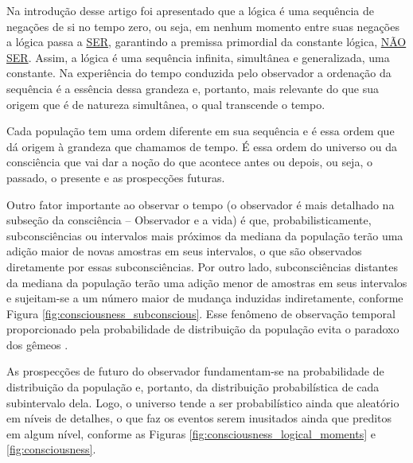 Na introdução desse artigo foi apresentado que a lógica é uma sequência de negações de si no tempo zero, ou seja, em nenhum momento entre suas negações a lógica passa a \underline{SER}, garantindo a premissa primordial da constante lógica, \underline{NÃO SER}. Assim, a lógica é uma sequência infinita, simultânea e generalizada, uma constante. Na experiência do tempo conduzida pelo observador a ordenação da sequência é a essência dessa grandeza e, portanto, mais relevante do que sua origem que é de natureza simultânea, o qual transcende o tempo.

Cada população tem uma ordem diferente em sua sequência e é essa ordem que dá origem à grandeza que chamamos de tempo. É essa ordem do universo ou da consciência que vai dar a noção do que acontece antes ou depois, ou seja, o passado, o presente e as prospecções futuras.

Outro fator importante ao observar o tempo (o observador é mais detalhado na subseção da consciência – Observador e a vida) é que, probabilisticamente, subconsciências ou intervalos mais próximos da mediana da população terão uma adição maior de novas amostras em seus intervalos, o que são observados diretamente por essas subconsciências. Por outro lado, subconsciências distantes da mediana da população terão uma adição menor de amostras em seus intervalos e sujeitam-se a um número maior de mudança induzidas indiretamente, conforme Figura \ref{fig:consciousness_subconscious}. Esse fenômeno de observação temporal proporcionado pela probabilidade de distribuição da população evita o paradoxo dos gêmeos \cite{brasilescola_paradoxo_gemeos}.

As prospecções de futuro do observador fundamentam-se na probabilidade de distribuição da população e, portanto, da distribuição probabilística de cada subintervalo dela. Logo, o universo tende a ser probabilístico ainda que aleatório em níveis de detalhes, o que faz os eventos serem inusitados ainda que preditos em algum nível, conforme as Figuras \ref{fig:consciousness_logical_moments} e \ref{fig:consciousness}. 

